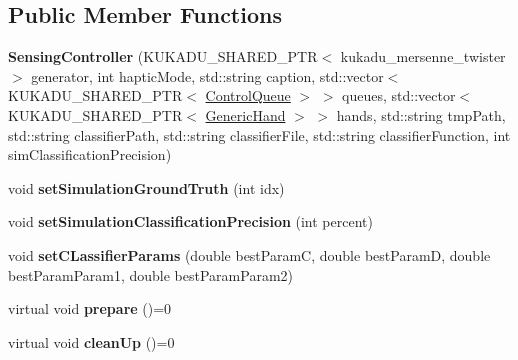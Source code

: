 \subsection*{Public Member Functions}
\begin{DoxyCompactItemize}
\item 
\hypertarget{classkukadu_1_1SensingController_aa59dea6c4b12d443fdf70c4d1fbae0a2}{{\bfseries Sensing\-Controller} (K\-U\-K\-A\-D\-U\-\_\-\-S\-H\-A\-R\-E\-D\-\_\-\-P\-T\-R$<$ kukadu\-\_\-mersenne\-\_\-twister $>$ generator, int haptic\-Mode, std\-::string caption, std\-::vector$<$ K\-U\-K\-A\-D\-U\-\_\-\-S\-H\-A\-R\-E\-D\-\_\-\-P\-T\-R$<$ \hyperlink{classkukadu_1_1ControlQueue}{Control\-Queue} $>$ $>$ queues, std\-::vector$<$ K\-U\-K\-A\-D\-U\-\_\-\-S\-H\-A\-R\-E\-D\-\_\-\-P\-T\-R$<$ \hyperlink{classkukadu_1_1GenericHand}{Generic\-Hand} $>$ $>$ hands, std\-::string tmp\-Path, std\-::string classifier\-Path, std\-::string classifier\-File, std\-::string classifier\-Function, int sim\-Classification\-Precision)}\label{classkukadu_1_1SensingController_aa59dea6c4b12d443fdf70c4d1fbae0a2}

\item 
\hypertarget{classkukadu_1_1SensingController_ae8428df9d71c638898ce1d6dfcb15ce0}{void {\bfseries set\-Simulation\-Ground\-Truth} (int idx)}\label{classkukadu_1_1SensingController_ae8428df9d71c638898ce1d6dfcb15ce0}

\item 
\hypertarget{classkukadu_1_1SensingController_a315e5f755a250c6c870f23cb804b5302}{void {\bfseries set\-Simulation\-Classification\-Precision} (int percent)}\label{classkukadu_1_1SensingController_a315e5f755a250c6c870f23cb804b5302}

\item 
\hypertarget{classkukadu_1_1SensingController_a1f96456904337d66733aceb0733dc0fd}{void {\bfseries set\-C\-Lassifier\-Params} (double best\-Param\-C, double best\-Param\-D, double best\-Param\-Param1, double best\-Param\-Param2)}\label{classkukadu_1_1SensingController_a1f96456904337d66733aceb0733dc0fd}

\item 
\hypertarget{classkukadu_1_1SensingController_afca2a16b9b8d131da2d6f5bc1a978008}{virtual void {\bfseries prepare} ()=0}\label{classkukadu_1_1SensingController_afca2a16b9b8d131da2d6f5bc1a978008}

\item 
\hypertarget{classkukadu_1_1SensingController_a0b17a753858f594083f885586fa9b600}{virtual void {\bfseries clean\-Up} ()=0}\label{classkukadu_1_1SensingController_a0b17a753858f594083f885586fa9b600}


\end{DoxyCompactItemize}
